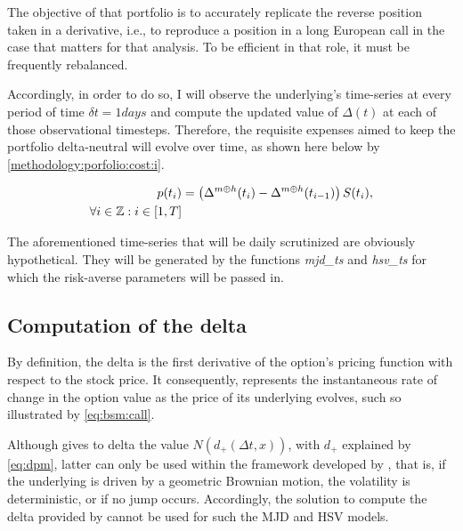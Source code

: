 \documentclass[12pt,a4paper]{report}
\newcommand{\Dt}{\Delta t}
\newcommand{\N}[1]{N\left(#1\right)}
\newcommand{\dsub}[1]{d_{#1}\left(\Dt, x\right)}
\begin{document}
The objective of that portfolio is to accurately replicate the reverse position taken in a derivative, i.e., to reproduce a position in a long European call in the case that matters for that analysis.
To be efficient in that role, it must be frequently rebalanced.

Accordingly, in order to do so, I will observe the underlying's time-series at every period of time $\delta t = 1 days$ and compute the updated value of $\Delta(t)$  at each of those observational timesteps.
Therefore, the requisite expenses aimed to keep the portfolio delta-neutral will evolve over time, as shown here below by \cref{methodology:porfolio:cost:i}.

\begin{align}
p(t_i) & = \left(\Delta^{m \oplus h}(t_i) - \Delta^{m \oplus h}(t_{i - 1})\right) S(t_i) 
,\label{methodology:porfolio:cost:i} \\
\forall i \in \mathbb{Z} : i \in \left [1, T \right ] \notag
\end{align}

The aforementioned time-series that will be daily scrutinized are obviously hypothetical. They will be generated by the functions \textit{mjd\_ts} and \textit{hsv\_ts} for which the risk-averse parameters will be passed in.





\subsection{Computation of the delta}
\label{sec:methodology:computation:delta}

By definition, the delta is the first derivative of the option's pricing function with respect to the stock price. It consequently, represents the instantaneous rate of change in the option value as the price of its underlying evolves, such so illustrated by \cref{eq:bsm:call}.

Although \citet{bs} gives to delta the value $\N{\dsub{+}}$, with $d_{+}$ explained by \cref{eq:dpm}, latter can only be used within the framework developed by \citet{bs}, that is, if the underlying is driven by a geometric Brownian motion, the volatility is deterministic, or if no jump occurs.
Accordingly, the solution to compute the delta provided by \citet{bs} cannot be used for such the MJD and HSV models.
\end{document}
